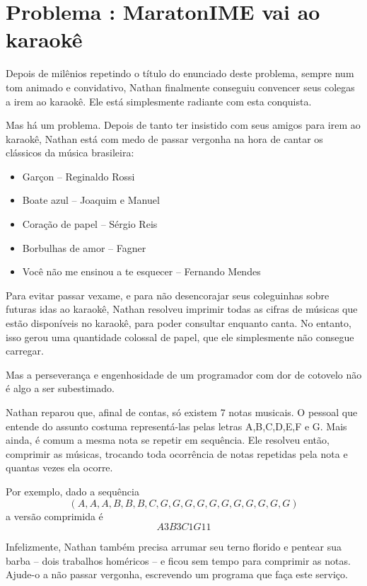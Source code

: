 \section*{Problema \proxLetra: MaratonIME vai ao karaokê}

Depois de milênios repetindo o título do enunciado deste problema, sempre num tom animado e convidativo,
Nathan finalmente conseguiu convencer seus colegas a irem ao karaokê. Ele está simplesmente radiante com
esta conquista.

Mas há um problema. Depois de tanto ter insistido com seus amigos para irem ao karaokê, Nathan está com
medo de passar vergonha na hora de cantar os clássicos da música brasileira:
\begin{itemize}
    \item Garçon -- Reginaldo Rossi
    \item Boate azul -- Joaquim e Manuel
    \item Coração de papel -- Sérgio Reis
    \item Borbulhas de amor -- Fagner
    \item Você não me ensinou a te esquecer -- Fernando Mendes
\end{itemize}

Para evitar passar vexame, e para não desencorajar seus coleguinhas sobre futuras idas ao karaokê, Nathan
resolveu imprimir todas as cifras de músicas que estão disponíveis no karaokê, para poder consultar enquanto
canta. No entanto, isso gerou uma quantidade colossal de papel, que ele simplesmente não consegue carregar.

Mas a perseverança e engenhosidade de um programador com dor de cotovelo não é algo a ser subestimado.

Nathan reparou que, afinal de contas, só existem 7 notas musicais. O pessoal que entende do assunto costuma
representá-las pelas letras A,B,C,D,E,F e G. Mais ainda, é comum a mesma nota se repetir em sequência. Ele
resolveu então, comprimir as músicas, trocando toda ocorrência de notas repetidas pela nota e quantas vezes
ela ocorre.

Por exemplo, dado a sequência
\[(A,A,A,B,B,B,C,G,G,G,G,G,G,G,G,G,G,G)\]
a versão comprimida é 
\[A3B3C1G11\]

Infelizmente, Nathan também precisa arrumar seu terno florido e pentear sua barba -- dois trabalhos homéricos -- e
ficou sem tempo para comprimir as notas. Ajude-o a não passar vergonha, escrevendo um programa que faça
este serviço.

